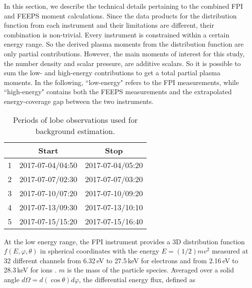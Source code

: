 \documentclass[draft]{agujournal2019}
\begin{document}
In this section, we describe the technical details pertaining to the combined FPI and FEEPS moment calculations. Since the data products for the distribution function from each instrument and their limitations are different, their combination is non-trivial. Every instrument is constrained within a certain energy range. So the derived plasma moments from the distribution function are only partial contributions. However, the main moments of interest for this study, the number density and scalar pressure, are additive scalars. So it is possible to sum the low- and high-energy contributions to get a total partial plasma moments. In the following, ``low-energy" refers to the FPI measurements, while ``high-energy" contains both the FEEPS measurements and the extrapolated energy-coverage gap between the two instruments.

\begin{table}
\caption{Periods of lobe observations used for background estimation.}
\label{tab:lobe_periods}
\centering
\begin{tabular}{c c c}
\hline
     & Start & Stop \\
\hline
    1 & 2017-07-04/04:50 & 2017-07-04/05:20\\
    2 & 2017-07-07/02:30 & 2017-07-07/03:20\\
    3 & 2017-07-10/07:20 & 2017-07-10/09:20\\
    4 & 2017-07-13/09:30 & 2017-07-13/10:10\\
    5 & 2017-07-15/15:20 & 2017-07-15/16:40\\
\hline
\end{tabular}
\end{table}

At the low energy range, the FPI instrument provides a 3D distribution function $f(E, \varphi, \theta)$ in spherical coordinates with the energy $E=(1/2)mv^2$ measured at 32 different channels from 6.32\,\si{eV} to 27.5\,\si{keV} for electrons and from 2.16\,\si{eV} to 28.3\,\si{keV} for ions \cite{Pollock2016}. $m$ is the mass of the particle species. Averaged over a solid angle $d\Omega=d(\cos\theta)d\varphi$, the differential energy flux, defined as \cite{Larsen2022}
\end{document}
